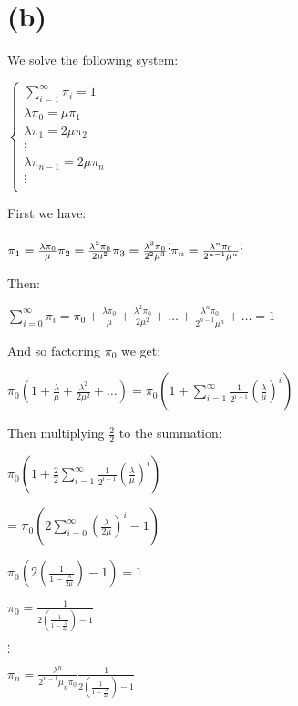 \documentclass[]{article}
\begin{document}
\hypertarget{b-1}{%
\section{(b)}\label{b-1}}

We solve the following system:

\(\begin{cases} \sum_{i = 1}^{\infty} \pi_i = 1 \\ \lambda \pi_0 = \mu \pi_1 \\ \lambda \pi_1 = 2 \mu \pi_2 \\ \vdots \\ \lambda \pi_{n-1} = 2 \mu \pi_n \\ \vdots \\ \end{cases}\)

First we have:

\(\pi_1 = \frac{\lambda \pi_0}{\mu} \\ \pi_2 = \frac{\lambda^2 \pi_0}{2 \mu^2} \\ \pi_3 = \frac{\lambda^3 \pi_0}{2^2 \mu^3} \\ \vdots \\ \pi_n = \frac{\lambda^n \pi_0}{2^{n-1} \mu^n} \\ \vdots\)

Then:

\(\sum_{i=0}^{\infty} \pi_i = \pi_0 + \frac{\lambda \pi_0}{\mu} + \frac{\lambda^2 \pi_0}{2 \mu^2} + \dots + \frac{\lambda^n \pi_0}{2^{n-1} \mu^n} + \dots = 1\)

And so factoring \(\pi_0\) we get:

\(\pi_0 (1 + \frac{\lambda}{\mu} + \frac{\lambda^2}{2 \mu^2} + \dots) = \pi_0 (1 + \sum_{i=1}^{\infty} \frac{1}{2^{i-1}} (\frac{\lambda}{\mu})^{i})\)

Then multiplying \(\frac{2}{2}\) to the summation:

\(\pi_0 (1 + \frac{2}{2} \sum_{i=1}^{\infty} \frac{1}{2^{i-1}} (\frac{\lambda}{\mu})^{i})\)

= \(\pi_0 (2 \sum_{i=0}^{\infty} (\frac{\lambda}{2 \mu})^{i} - 1)\)

\(\pi_0 (2 (\frac{1}{1 - \frac{\lambda}{2 \mu}}) - 1) = 1\)

\(\pi_0 = \frac{1}{2 (\frac{1}{1 - \frac{\lambda}{2 \mu}}) - 1}\)

\(\vdots\)

\(\pi_n = \frac{\lambda^n}{2^{n-1}{\mu_n} \pi_0} \frac{1}{2 (\frac{1}{1 - \frac{\lambda}{2 \mu}}) - 1}\)
\end{document}
